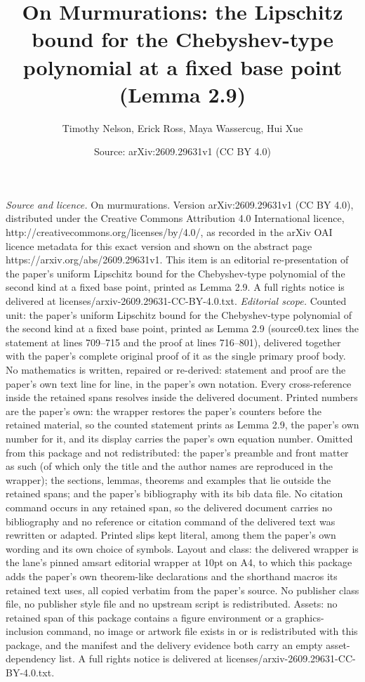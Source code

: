 \documentclass[10pt,a4paper]{amsart}
\title[On murmurations]{On Murmurations: the Lipschitz bound for the Chebyshev-type polynomial at a fixed base point (Lemma 2.9)}
\author[T. Nelson, E. Ross, M. Wassercug, H. Xue]{Timothy Nelson, Erick Ross, Maya Wassercug, Hui Xue}
\date{Source: arXiv:2609.29631v1 (CC BY 4.0)}
\theoremstyle{plain}
\theoremstyle{definition}
\numberwithin{equation}{section}
\numberwithin{figure}{section}
\numberwithin{table}{section}
\begin{document}
\maketitle
\vspace{1em}
\noindent\textit{Source and licence.} On murmurations. Version arXiv:2609.29631v1 (CC BY 4.0), distributed under the Creative Commons Attribution 4.0 International licence, http://creativecommons.org/licenses/by/4.0/, as recorded in the arXiv OAI licence metadata for this exact version and shown on the abstract page https://arxiv.org/abs/2609.29631v1. This item is an editorial re-presentation of the paper's uniform Lipschitz bound for the Chebyshev-type polynomial of the second kind at a fixed base point, printed as Lemma 2.9. A full rights notice is delivered at licenses/arxiv-2609.29631-CC-BY-4.0.txt.
\noindent\textit{Editorial scope.} Counted unit: the paper's uniform Lipschitz bound for the Chebyshev-type polynomial of the second kind at a fixed base point, printed as Lemma 2.9 (source0.tex lines the statement at lines 709--715 and the proof at lines 716--801), delivered together with the paper's complete original proof of it as the single primary proof body. No mathematics is written, repaired or re-derived: statement and proof are the paper's own text line for line, in the paper's own notation. Every cross-reference inside the retained spans resolves inside the delivered document. Printed numbers are the paper's own: the wrapper restores the paper's counters before the retained material, so the counted statement prints as Lemma 2.9, the paper's own number for it, and its display carries the paper's own equation number. Omitted from this package and not redistributed: the paper's preamble and front matter as such (of which only the title and the author names are reproduced in the wrapper); the sections, lemmas, theorems and examples that lie outside the retained spans; and the paper's bibliography with its bib data file. No citation command occurs in any retained span, so the delivered document carries no bibliography and no reference or citation command of the delivered text was rewritten or adapted. Printed slips kept literal, among them the paper's own wording and its own choice of symbols. Layout and class: the delivered wrapper is the lane's pinned amsart editorial wrapper at 10pt on A4, to which this package adds the paper's own theorem-like declarations and the shorthand macros its retained text uses, all copied verbatim from the paper's source. No publisher class file, no publisher style file and no upstream script is redistributed. Assets: no retained span of this package contains a figure environment or a graphics-inclusion command, no image or artwork file exists in or is redistributed with this package, and the manifest and the delivery evidence both carry an empty asset-dependency list. A full rights notice is delivered at licenses/arxiv-2609.29631-CC-BY-4.0.txt.
\end{document}
